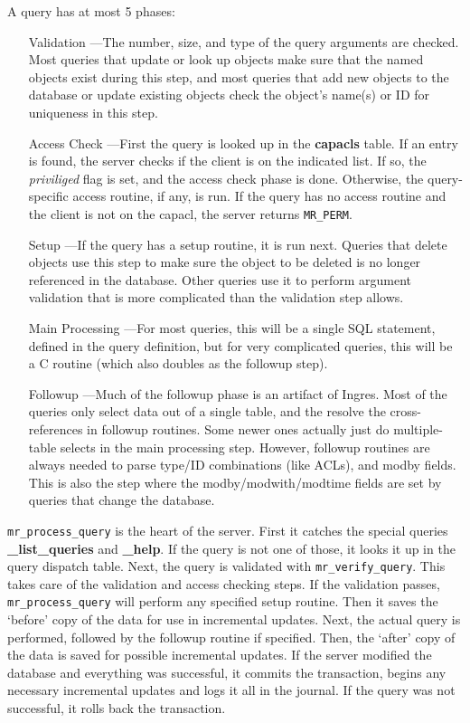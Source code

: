 A query has at most 5 phases:

\begin{enumerate}
\item[Validation]---The number, size, and type of the query arguments
are checked. Most queries that update or look up objects make sure
that the named objects exist during this step, and most queries that
add new objects to the database or update existing objects check the
object's name(s) or ID for uniqueness in this step.

\item[Access Check]---First the query is looked up in the {\bf
capacls} table. If an entry is found, the server checks if the client
is on the indicated list. If so, the {\it priviliged\/} flag is set,
and the access check phase is done. Otherwise, the query-specific
access routine, if any, is run. If the query has no access routine and
the client is not on the capacl, the server returns {\tt MR_PERM}.

\item[Setup]---If the query has a setup routine, it is run next.
Queries that delete objects use this step to make sure the object to
be deleted is no longer referenced in the database. Other queries use
it to perform argument validation that is more complicated than the
validation step allows.

\item[Main Processing]---For most queries, this will be a single SQL
statement, defined in the query definition, but for very complicated
queries, this will be a C routine (which also doubles as the followup
step).

\item[Followup]---Much of the followup phase is an artifact of Ingres.
Most of the queries only select data out of a single table, and the
resolve the cross-references in followup routines. Some newer ones
actually just do multiple-table selects in the main processing step.
However, followup routines are always needed to parse type/ID
combinations (like ACLs), and modby fields. This is also the step
where the modby/modwith/modtime fields are set by queries that change
the database.
\end{enumerate}

{\tt mr\_process\_query} is the heart of the server. First it catches
the special queries {\bf \_list\_queries} and {\bf \_help}. If the
query is not one of those, it looks it up in the query dispatch table.
Next, the query is validated with {\tt mr\_verify\_query}. This takes
care of the validation and access checking steps. If the validation
passes, {\tt mr\_process\_query} will perform any specified setup
routine. Then it saves the `before' copy of the data for use in
incremental updates. Next, the actual query is performed, followed by
the followup routine if specified. Then, the `after' copy of the data
is saved for possible incremental updates. If the server modified the
database and everything was successful, it commits the transaction,
begins any necessary incremental updates and logs it all in the
journal. If the query was not successful, it rolls back the
transaction.

